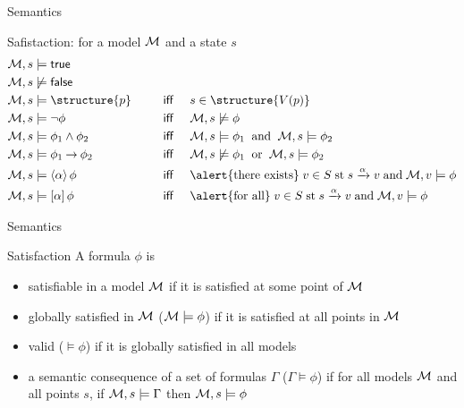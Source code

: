 \documentclass[aspectratio=169]{beamer}
\begin{document}
\begin{slide}{Semantics}\label{s:13}
\small
\begin{block}{Safistaction: for a model $\mathcal{M}$ and a state $s$}
\begin{align*}
\ger{M}, s & \models \true &&\\
\ger{M}, s & \not \models  \false &&\\
\ger{M}, s & \models  \structure{p} &  \text{~~~ \textsf{iff} ~~~}  & s \in \structure{V(p)}\\
\ger{M}, s  & \models \neg \phi  & \text{~~~ \textsf{iff} ~~~} & \ger{M}, s  \not \models \phi \\
\ger{M}, s & \models \phi_1 \land \phi_2  &\text{~~~ \textsf{iff} ~~~} & \ger{M}, s \models  \phi_1 \;\; \text{and}\;\;
                                                   \ger{M}, s \models  \phi_2 \\
\ger{M}, s & \models \phi_1 \impp \phi_2 & \text{~~~ \textsf{iff} ~~~} & \ger{M}, s \not \models \phi_1  \;\; \text{or}\;\; 
                                                  \ger{M}, s \models \phi_2 \\
\ger{M}, s  &\models \evm{\alpha}{\phi} & \text{ ~~~ \textsf{iff} ~~~} &
\text{\alert{there exists}}\; v \in S \;\text{st}\; s \xrightarrow{\alpha} v\; \text{and}\; \ger{M}, v \models \phi\\
\ger{M}, s & \models \alm{\alpha}{\phi} & \text{~~~ \textsf{iff} ~~~} &
\text{\alert{for all}}\; v \in S \; \text{st}\; s \xrightarrow{\alpha} v\; \text{and}\; \ger{M}, v \models \phi\\
\end{align*}
\end{block}
\end{slide}


\begin{slide}{Semantics}\label{s:14}
\small
\begin{block}{Satisfaction}
A formula $\phi$ is
\begin{itemize}
\item \alert{satisfiable in a model}  $\mathcal{M}$ if it is satisfied at some point of $\mathcal{M}$
\item \alert{globally satisfied} in $\mathcal{M}$ ($\mathcal{M} \models \phi$) if it is satisfied at all points in $\mathcal{M}$
\item \alert{valid} ($\models \phi$) if it is globally satisfied in all models
\item \alert{a semantic consequence} of a set of formulas $\Gamma$ ($\Gamma \models \phi$) if for all models $\mathcal{M}$ and all
points $s$, if $\mathcal{M}, s \models \Gamma$ then $\mathcal{M}, s \models \phi$
\end{itemize}
\end{block}
\end{slide}
\end{document}

